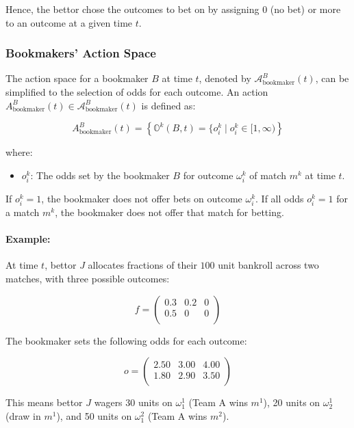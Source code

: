 Hence, the bettor chose the outcomes to bet on by assigning 0 (no bet) or more to an outcome at a given time \(t\).


\subsubsection{Bookmakers' Action Space}

The action space for a bookmaker \( B \) at time \( t \), denoted by \( \mathcal{A}_{\text{bookmaker}}^B(t) \), can be simplified to the selection of odds for each outcome. An action \( A_{\text{bookmaker}}^B(t) \in \mathcal{A}_{\text{bookmaker}}^B(t) \) is defined as:

\[
A_{\text{bookmaker}}^B(t) = \left\{ \mathbb{O}^k(B, t) = \{ o_i^k \mid o_i^k \in [1, \infty) \right\}
\]

where:

\begin{itemize}
    \item \( o_i^k \): The odds set by the bookmaker \( B \) for outcome \( \omega_i^k \) of match \( m^k \) at time \( t \). 
\end{itemize}

If \( o_i^k = 1 \), the bookmaker does not offer bets on outcome \( \omega_i^k \). If all odds \( o_i^k = 1 \) for a match \( m^k \), the bookmaker does not offer that match for betting.

\paragraph{Example:}
At time \( t \), bettor \( J \) allocates fractions of their \( 100 \) unit bankroll across two matches, with three possible outcomes:

\[
f = \begin{pmatrix}
0.3 & 0.2 & 0 \\
0.5 & 0 & 0 \\
\end{pmatrix}
\]

The bookmaker sets the following odds for each outcome:

\[
o = \begin{pmatrix}
2.50 & 3.00 & 4.00 \\
1.80 & 2.90 & 3.50 \\
\end{pmatrix}
\]

This means bettor \( J \) wagers 30 units on \( \omega_1^1 \) (Team A wins \( m^1 \)), 20 units on \( \omega_2^1 \) (draw in \( m^1 \)), and 50 units on \( \omega_1^2 \) (Team A wins \( m^2 \)).


